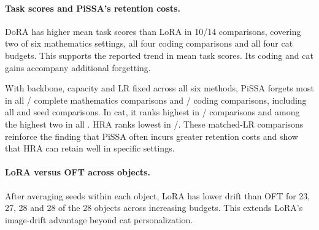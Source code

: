 

\paragraph{Task scores and PiSSA's retention costs.}
DoRA has higher mean task scores than LoRA in 10/14 comparisons, covering two of six mathematics settings, all four coding comparisons and all four cat budgets. This supports the reported trend in mean task scores. Its coding and cat gains accompany additional forgetting.

With backbone, capacity and LR fixed across all six methods, PiSSA forgets most in all / complete mathematics comparisons and / coding comparisons, including all  and  seed comparisons. In cat, it ranks highest in / comparisons and among the highest two in all . HRA ranks lowest in /. These matched-LR comparisons reinforce the finding that PiSSA often incurs greater retention costs and show that HRA can retain well in specific settings.

\paragraph{LoRA versus OFT across objects.}
After averaging seeds within each object, LoRA has lower drift than OFT for 23, 27, 28 and 28 of the 28 objects across increasing budgets. This extends LoRA's image-drift advantage beyond cat personalization.

